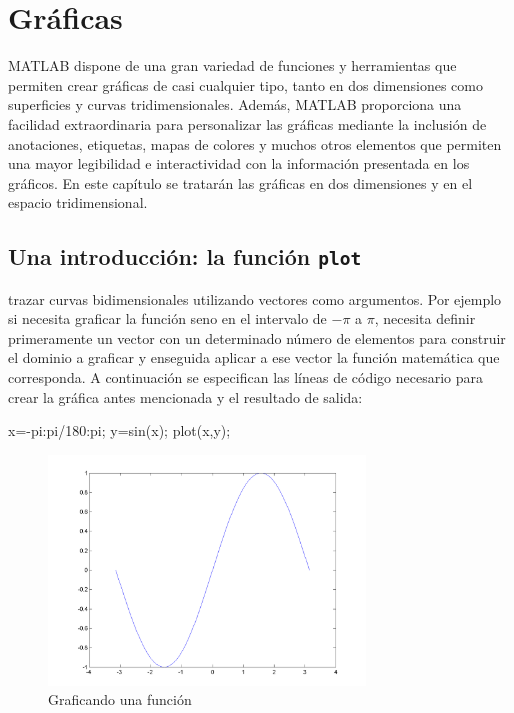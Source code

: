 \chapter{Gráficas}

MATLAB dispone de una gran variedad de funciones y herramientas que
permiten crear gráficas de casi cualquier tipo, tanto en dos dimensiones
como superficies y curvas tridimensionales. Además, MATLAB proporciona
una facilidad extraordinaria para personalizar las gráficas mediante la
inclusión de anotaciones, etiquetas, mapas de colores y muchos otros
elementos que permiten una mayor legibilidad e interactividad con la
información presentada en los gráficos. En este capítulo se tratarán las
gráficas en dos dimensiones y en el espacio tridimensional.

\section{Una introducción: la función \texttt{plot}}

trazar curvas bidimensionales utilizando vectores como argumentos. Por
ejemplo si necesita graficar la función seno en el intervalo de
$-\pi$ a $\pi$, necesita definir primeramente un
vector con un determinado número de elementos para construir el dominio
a graficar y enseguida aplicar a ese vector la función matemática que
corresponda. A continuación se especifican las líneas de código
necesario para crear la gráfica antes mencionada y el resultado de
salida:

\begin{matlab}
x=-pi:pi/180:pi;
y=sin(x);
plot(x,y);
\end{matlab}


\begin{figure}[htbp]
    \centering
    \includegraphics[width=0.75\textwidth]{images/ch4/img_4_1.png}
    \caption{Graficando una función}
    \label{fig:img_4_1}
\end{figure}



